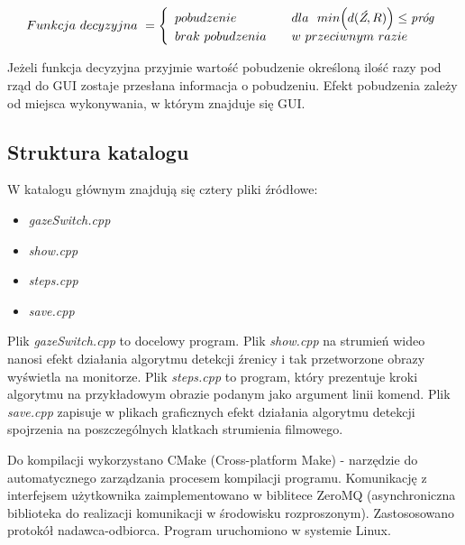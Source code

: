 \[ Funkcja\ decyzyjna\ = \left\{
  \begin{array}{l l}
    pobudzenie & \quad dla \ \ min\Big(d(\textit{Ź},R)\Big) \le \textit{próg}\\
    brak\ pobudzenia & \quad w\ przeciwnym\ razie
  \end{array} \right.\]

Jeżeli funkcja decyzyjna przyjmie wartość pobudzenie określoną ilość razy pod rząd do GUI zostaje przesłana informacja o pobudzeniu. Efekt pobudzenia zależy od miejsca wykonywania, w którym znajduje się GUI.

\newpage
\subsection{Struktura katalogu}
W katalogu głównym znajdują się cztery pliki źródłowe:
\begin{itemize}
\item \textit{gazeSwitch.cpp}
\item \textit{show.cpp}
\item \textit{steps.cpp}
\item \textit{save.cpp}
\end{itemize}

Plik \textit{gazeSwitch.cpp} to docelowy program. Plik \textit{show.cpp} na strumień wideo nanosi efekt działania algorytmu detekcji źrenicy i tak przetworzone obrazy wyświetla na monitorze. Plik \textit{steps.cpp} to program, który prezentuje kroki algorytmu na przykładowym obrazie podanym jako argument linii komend. Plik \textit{save.cpp} zapisuje w plikach graficznych efekt działania algorytmu detekcji spojrzenia na poszczególnych klatkach strumienia filmowego.

Do kompilacji wykorzystano CMake (Cross-platform Make) - narzędzie do automatycznego zarządzania procesem kompilacji programu. Komunikację z interfejsem użytkownika zaimplementowano w biblitece ZeroMQ (asynchroniczna biblioteka do realizacji komunikacji w środowisku rozproszonym). Zastososowano protokół nadawca-odbiorca. Program uruchomiono w systemie Linux.
